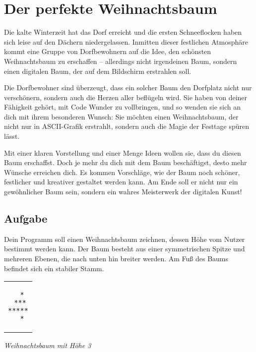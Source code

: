\documentclass[12pt,a4paper]{article}
\begin{document}
\newpage
{}

\section{Der perfekte Weihnachtsbaum}

Die kalte Winterzeit hat das Dorf erreicht und die ersten Schneeflocken haben sich leise auf den Dächern niedergelassen. Inmitten dieser festlichen Atmosphäre kommt eine Gruppe von Dorfbewohnern auf die Idee, den schönsten Weihnachtsbaum zu erschaffen – allerdings nicht irgendeinen Baum, sondern einen digitalen Baum, der auf dem Bildschirm erstrahlen soll.

\smallskip

Die Dorfbewohner sind überzeugt, dass ein solcher Baum den Dorfplatz nicht nur verschönern, sondern auch die Herzen aller beflügeln wird. Sie haben von deiner Fähigkeit gehört, mit Code Wunder zu vollbringen, und so wenden sie sich an dich mit ihrem besonderen Wunsch: Sie möchten einen Weihnachtsbaum, der nicht nur in ASCII-Grafik erstrahlt, sondern auch die Magie der Festtage spüren lässt.

\smallskip

Mit einer klaren Vorstellung und einer Menge Ideen wollen sie, dass du diesen Baum erschaffst. Doch je mehr du dich mit dem Baum beschäftigst, desto mehr Wünsche erreichen dich. Es kommen Vorschläge, wie der Baum noch schöner, festlicher und kreativer gestaltet werden kann. Am Ende soll er nicht nur ein gewöhnlicher Baum sein, sondern ein wahres Meisterwerk der digitalen Kunst!

\subsection{Aufgabe}

Dein Programm soll einen Weihnachtsbaum zeichnen, dessen Höhe vom Nutzer bestimmt werden kann. Der Baum besteht aus einer symmetrischen Spitze und mehreren Ebenen, die nach unten hin breiter werden. Am Fuß des Baums befindet sich ein stabiler Stamm.
\begin{center}
\begin{tcolorbox}[frame empty,nobeforeafter,colback=gray!5]
\centering%
\begin{tabular}{c}
\begin{lstlisting}
  *
 ***
*****
  *
\end{lstlisting}
\end{tabular}
\end{tcolorbox}
\textit{\small Weihnachtsbaum mit Höhe 3}
\end{center}
\end{document}
